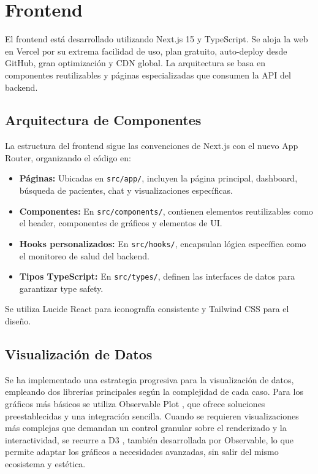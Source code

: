\newpage
\section{Frontend}


El frontend está desarrollado utilizando Next.js 15 y TypeScript. Se aloja la web en Vercel por su extrema facilidad de uso, plan gratuito, auto-deploy desde GitHub, gran optimización y CDN global. La arquitectura se basa en componentes reutilizables y páginas especializadas que consumen la API del backend.



\subsection{Arquitectura de Componentes}

La estructura del frontend sigue las convenciones de Next.js con el nuevo App Router, organizando el código en:

\begin{itemize}
\item \textbf{Páginas:} Ubicadas en \texttt{src/app/}, incluyen la página principal, dashboard, búsqueda de pacientes, chat y visualizaciones específicas.
\item \textbf{Componentes:} En \texttt{src/components/}, contienen elementos reutilizables como el header, componentes de gráficos y elementos de UI.
\item \textbf{Hooks personalizados:} En \texttt{src/hooks/}, encapsulan lógica específica como el monitoreo de salud del backend.
\item \textbf{Tipos TypeScript:} En \texttt{src/types/}, definen las interfaces de datos para garantizar type safety.
\end{itemize}

Se utiliza Lucide React para iconografía consistente y Tailwind CSS para el diseño.

\subsection{Visualización de Datos}

Se ha implementado una estrategia progresiva para la visualización de datos, empleando dos librerías principales según la complejidad de cada caso. Para los gráficos más básicos se utiliza Observable Plot \cite{observableplot}, que ofrece soluciones preestablecidas y una integración sencilla. Cuando se requieren visualizaciones más complejas que demandan un control granular sobre el renderizado y la interactividad, se recurre a D3 \cite{d3}, también desarrollada por Observable, lo que permite adaptar los gráficos a necesidades avanzadas, sin salir del mismo ecosistema y estética.

